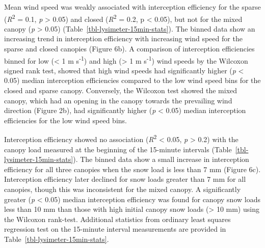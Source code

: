 \documentclass[
  letterpaper,
  DIV=11,
  numbers=noendperiod]{scrartcl}
\begin{document}
Mean wind speed was weakly associated with interception efficiency for
the sparse (\emph{R}\textsuperscript{2} = 0.1, \emph{p} \textgreater{}
0.05) and closed (\emph{R}\textsuperscript{2} = 0.2, p \textless{}
0.05), but not for the mixed canopy (\emph{p} \textgreater{} 0.05)
(Table~\ref{tbl-lysimeter-15min-stats}). The binned data show an
increasing trend in interception efficiency with increasing wind speed
for the sparse and closed canopies (Figure 6b). A comparison of
interception efficiencies binned for low (\textless{} 1 m
s\textsuperscript{-1}) and high (\textgreater{} 1 m
s\textsuperscript{-1}) wind speeds by the Wilcoxon signed rank test,
showed that high wind speeds had significantly higher (\emph{p}
\textless{} 0.05) median interception efficiencies compared to the low
wind speed bins for the closed and sparse canopy. Conversely, the
Wilcoxon test showed the mixed canopy, which had an opening in the
canopy towards the prevailing wind direction (Figure 2b), had
significantly higher (\emph{p} \textless{} 0.05) median interception
efficiencies for the low wind speed bins.

Interception efficiency showed no association
(\emph{R}\textsuperscript{2} \textless{} 0.05, \emph{p} \textgreater{}
0.2) with the canopy load measured at the beginning of the 15-minute
intervals (Table~\ref{tbl-lysimeter-15min-stats}). The binned data show
a small increase in interception efficiency for all three canopies when
the snow load is less than 7 mm (Figure 6c). Interception efficiency
later declined for snow loads greater than 7 mm for all canopies, though
this was inconsistent for the mixed canopy. A significantly greater
(\emph{p} \textless{} 0.05) median interception efficiency was found for
canopy snow loads less than 10 mm than those with high initial canopy
snow loads (\textgreater{} 10 mm) using the Wilcoxon rank-test.
Additional statistics from ordinary least squares regression test on the
15-minute interval measurements are provided in
Table~\ref{tbl-lysimeter-15min-stats}.
\end{document}
